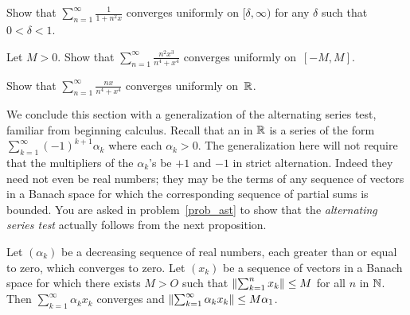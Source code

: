 \begin{prob} Show that $\sum_{n=1}^\infty\frac1{1 + n^2x}$ converges uniformly on
$[\delta,\infty)$ for any $\delta$ such that $0 < \delta < 1$.
\end{prob}

\begin{prob} Let $M > 0$.  Show that $\sum_{n=1}^\infty\frac{n^2x^3}{n^4+x^4}$ converges
uniformly on~$[-M,M]$.
\end{prob}

\begin{prob} Show that $\sum_{n=1}^\infty\frac{nx}{n^4 + x^4}$ converges uniformly on~$\mathbb{R}$.
\end{prob}

We conclude this section with a generalization of the alternating series test, familiar from
beginning calculus.  Recall that an
 in $\mathbb{R}$ is a series of the form $\sum_{k=1}^\infty (-1)^{k+1}
\alpha_k$ where each $\alpha_k > 0$. The generalization here will not require that the
multipliers of the $\alpha_k$'s be $+1$ and $-1$ in strict alternation.  Indeed they need not
even be real numbers; they may be the terms of any sequence of vectors in a Banach space for
which the corresponding sequence of partial sums is bounded.  You are asked in
problem~\ref{prob_ast} to show that the \emph{alternating series test} actually follows from
the next proposition.


\begin{prop}\label{prop_genl_ast} Let $(\alpha_k)$ be a decreasing sequence of real numbers,
each greater than or equal to zero, which converges to zero.  Let $(x_k)$ be a sequence of
vectors in a Banach space for which there exists $M>O$ such that $\left\lVert\sum_{k=1}^n x_k\right\rVert
\le M$ for all $n$ in $\mathbb{N}$.  Then $\sum_{k=1}^\infty \alpha_k x_k$ converges and
$\left\lVert\sum_{k=1}^\infty \alpha_k x_k\right\rVert \le M\alpha_1$.
\end{prop}

